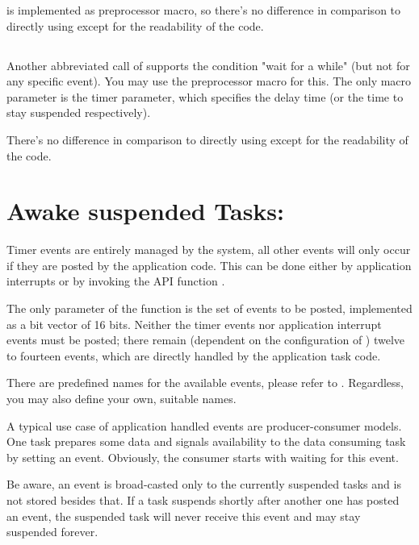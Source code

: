  is implemented as preprocessor macro, so
there's no difference in comparison to directly using
 except for the readability of the code.


\subsection{}

Another abbreviated call of  supports the
condition "wait for a while" (but not for any specific event). You may use
the preprocessor macro  for this. The only macro
parameter is the timer parameter, which specifies the delay time (or the
time to stay suspended respectively).

There's no difference in comparison to directly using
 except for the readability of the code.


\section{Awake suspended Tasks: }

Timer events are entirely managed by the system, all other events will
only occur if they are posted by the application code. This can be done
either by application interrupts or by invoking the API function
.

The only parameter of the function is the set of events to be posted,
implemented as a bit vector of 16 bits. Neither the timer events nor
application interrupt events must be posted; there remain (dependent on
the configuration of \rtos{}) twelve to fourteen events, which are
directly handled by the application task code.

There are predefined names for the available events, please refer to
. Regardless, you may also define your own, suitable names.

A typical use case of application handled events are producer-consumer
models. One task prepares some data and signals availability to the data
consuming task by setting an event. Obviously, the consumer starts with
waiting for this event.

Be aware, an event is broad-casted only to the currently suspended tasks
and is not stored besides that. If a task suspends shortly after another
one has posted an event, the suspended task will never receive this event
and may stay suspended forever.


